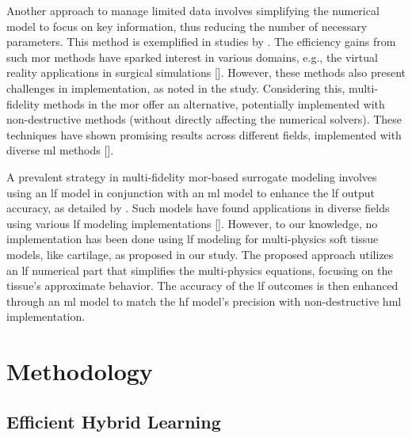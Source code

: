 \documentclass[12pt,a4paper]{report}
\begin{document}
Another approach to manage limited data involves simplifying the numerical model to focus on key information, thus reducing the number of necessary parameters. This method is exemplified in studies by \cite{pellicer-valero2020,niroomandi2012}. The efficiency gains from such \ac{mor} methods have sparked interest in various domains, e.g., the virtual reality applications in surgical simulations [\cite{cueto2014}]. However, these methods also present challenges in implementation, as noted in the \cite{lauzeral2019} study. Considering this, multi-fidelity methods in the \ac{mor} offer an alternative, potentially implemented with non-destructive methods (without directly affecting the numerical solvers). These techniques have shown promising results across different fields, implemented with diverse \ac{ml} methods [\cite{ahn2022,zhang2022,cheng2021,yang2019}].

A prevalent strategy in multi-fidelity \ac{mor}-based surrogate modeling involves using an \ac{lf} model in conjunction with an \ac{ml} model to enhance the \ac{lf} output accuracy, as detailed by \cite{peherstorfer2018}. Such models have found applications in diverse fields using various \ac{lf} modeling implementations [\cite{zhang2021,zhou2017}]. However, to our knowledge, no implementation has been done using \ac{lf} modeling for multi-physics soft tissue models, like cartilage, as proposed in our study. The proposed approach utilizes an \ac{lf} numerical part that simplifies the multi-physics equations, focusing on the tissue's approximate behavior. The accuracy of the \ac{lf} outcomes is then enhanced through an \ac{ml} model to match the \ac{hf} model's precision with non-destructive \ac{hml} implementation.

\section{Methodology}

\subsection{Efficient Hybrid Learning}
\end{document}
